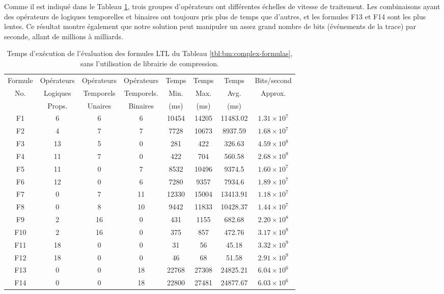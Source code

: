Comme il est indiqué dans le Tableau \ref{tbl:bm:complex}, trois groupes d'opérateurs ont différentes échelles de vitesse de traitement. Les combinaisons ayant des opérateurs de logiques temporelles et binaires ont toujours pris plus de temps que d'autres, et les formules F13 et F14 sont les plus lentes. Ce résultat montre également que notre solution peut manipuler un assez grand nombre de bits (événements de la trace) par seconde, allant de millions à milliards.

\begin{table}[h]
\centering
\small
\begin{tabular}{|c|c|c|c|c|c|c|c|}
\hline
Formule & Opérateurs & Opérateurs & Opérateurs & Temps & Temps & Temps & Bits/second \\
No. & Logiques & Temporels & Temporels. & Min.  & Max. & Avg. & Approx. \\
 & Props. & Unaires & Binaires & (ms) & (ms) & (ms) &  \\
\hline
F1 & 6 & 6 & 6 & 10454 & 14205 & 11483.02 & $1.31 \times 10^7$ \\
\hline
F2 & 4 & 7 & 7 & 7728 & 10673 & 8937.59 & $1.68 \times 10^7$  \\
\hline
F3 & 13 & 5 & 0 & 281 & 422 & 326.63 & $4.59 \times 10^8$  \\
\hline
F4 & 11 & 7 & 0 & 422 & 704 & 560.58 & $2.68 \times 10^8$  \\
\hline
F5 & 11 & 0 & 7 & 8532 & 10496 & 9374.5 & $1.60 \times 10^7$  \\
\hline
F6 & 12 & 0 & 6 & 7280 & 9357 & 7934.6 & $1.89 \times 10^7$  \\
\hline
F7 & 0 & 7 & 11 & 12330 & 15004 & 13413.91 & $1.18 \times 10^7$  \\
\hline
F8 & 0 & 8 & 10 & 9442 & 11833 & 10428.37 & $1.44 \times 10^7$  \\
\hline
F9 & 2 & 16 & 0 & 431 & 1155 & 682.68 & $2.20 \times 10^8$  \\
\hline
F10 & 2 & 16 & 0 & 375 & 857 & 472.76 & $3.17 \times 10^8$  \\
\hline
F11 & 18 & 0 & 0 & 31 & 56 & 45.18 & $3.32 \times 10^9$  \\
\hline
F12 & 18 & 0 & 0 & 46 & 68 & 51.58 & $2.91 \times 10^9$  \\
\hline
F13 & 0 & 0 & 18 & 22768 & 27308 & 24825.21 & $6.04 \times 10^6$  \\
\hline
F14 & 0 & 0 & 18 & 22800 & 27481 & 24877.67 & $6.03 \times 10^6$  \\
\hline
\end{tabular}
\vskip 8pt
\caption{Temps d'exécution de l'évaluation des formules LTL du Tableau \ref{tbl:bm:complex-formulas}, sans l'utilisation de librairie de compression.}
\label{tbl:bm:complex}
\end{table}

